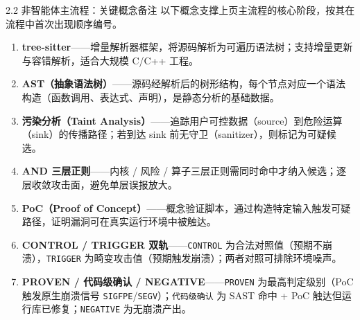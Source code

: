 \documentclass[11pt,aspectratio=169]{beamer}
\newcommand{\hlb}[1]{\textcolor{accentblue}{\textbf{#1}}}
\begin{document}
\begin{frame}{2.2 \quad 非智能体主流程：关键概念备注}
  \footnotesize
  以下概念支撑上页主流程的核心阶段，按其在流程中首次出现顺序编号。

  \vspace{0.22cm}
  \begin{enumerate}\setlength\itemsep{4pt}
    \item \hlb{tree-sitter}——增量解析器框架，将源码解析为可遍历语法树；支持增量更新与容错解析，适合大规模 C/C++ 工程。
    \item \hlb{AST（抽象语法树）}——源码经解析后的树形结构，每个节点对应一个语法构造（函数调用、表达式、声明），是静态分析的基础数据。
    \item \hlb{污染分析（Taint Analysis）}——追踪用户可控数据（source）到危险运算（sink）的传播路径；若到达 sink 前无守卫（sanitizer），则标记为可疑候选。
    \item \hlb{AND 三层正则}——内核 / 风险 / 算子三层正则需同时命中才纳入候选；逐层收敛攻击面，避免单层误报放大。
    \item \hlb{PoC（Proof of Concept）}——概念验证脚本，通过构造特定输入触发可疑路径，证明漏洞可在真实运行环境中被触达。
    \item \hlb{CONTROL / TRIGGER 双轨}——\texttt{CONTROL} 为合法对照值（预期不崩溃），\texttt{TRIGGER} 为畸变攻击值（预期触发崩溃）；两者对照可排除环境噪声。
    \item \hlb{PROVEN / 代码级确认 / NEGATIVE}——\texttt{PROVEN} 为最高判定级别（PoC 触发原生崩溃信号 \texttt{SIGFPE}/\texttt{SEGV}）；\texttt{代码级确认} 为 SAST 命中 + PoC 触达但运行库已修复；\texttt{NEGATIVE} 为无崩溃产出。
  \end{enumerate}
\end{frame}
\end{document}

